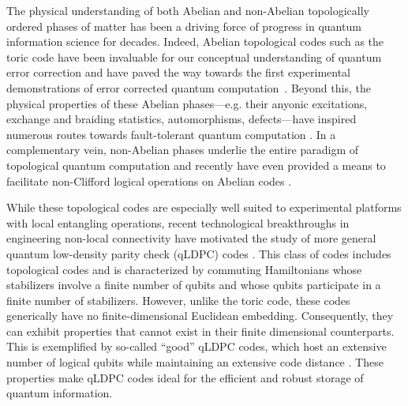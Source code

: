 \documentclass[aps,prx,reprint,superscriptaddress,nofootinbib]{revtex4-2}
\theoremstyle{definition}
\newcommand{\<}{\langle}
\renewcommand{\>}{\rangle}
\begin{document}
The physical understanding of both Abelian and non-Abelian topologically ordered phases of matter \cite{wen_topological_1990,RevModPhys.89.041004,Bravyi_2010} has been a driving force of progress in quantum information science for decades.
%
Indeed, Abelian topological codes such as the toric code have been invaluable for our conceptual understanding of quantum error correction and have paved the way towards the first experimental demonstrations of error corrected quantum computation~\cite{bluvstein_fault-tolerant_2026,bluvstein_logical_2024,google2025quantum}.
%
Beyond this, the physical properties of these Abelian phases—e.g. their anyonic excitations, exchange and braiding statistics, automorphisms, defects—have inspired numerous routes towards fault-tolerant quantum computation \cite{koenig_quantum_2010,yoshida_topological_2015,breuckmann_hyperbolic_2017,bridgeman_tensor_2017,kesselring_boundaries_2018,lavasani_universal_2019,zhu_instantaneous_2020,kesselring_anyon_2024,davydova_quantum_2024}.
%
In a complementary vein, non-Abelian phases underlie the entire paradigm of topological quantum computation \cite{Kitaev_2003,freedman_modular_2002,RevModPhys.80.1083,Bonderson_2008,levaillant_universal_2015,cui_universal_2015,beverland_protected_2016,cong_universal_2017,chen_universal_2025,lo_universal_2025} and recently have even provided a means to facilitate non-Clifford logical operations on Abelian codes \cite{bravyi_universal_2006,laubscher_universal_2019,margaritaknots,sajithcodes,kobayashi_clifford_2025,huang_hybrid_2025,warman_transversal_2025, hsin2025automorphismgaugetheorieshigher, hsin_non-abelian_2025}. 

While these topological codes are especially well suited to experimental platforms with local entangling operations, recent technological breakthroughs in engineering non-local connectivity \cite{Periwal_2021, bluvstein_logical_2024,chiu_continuous_2025,sinclair_fault-tolerant_2025,bluvstein_fault-tolerant_2026,moses_race-track_2023,ransford_helios_2025} have motivated the study of more general quantum low-density parity check (qLDPC) codes \cite{MacKay_2004,Tillich_2014,Breuckmann_2021_rev,panteleev_asymptotically_2022,Panteleev_2021,Breuckmann_2021,Hastings_2021,Leverrier_2015,leverrier2022quantumtannercodes,SipserSpiel,Bravyi_2024,Kovalev_2013}. 
%
This class of codes includes topological codes and is characterized by commuting Hamiltonians whose stabilizers involve a finite number of qubits and whose qubits participate in a finite number of stabilizers.
%
However, unlike the toric code, these codes generically have no finite-dimensional Euclidean embedding.
%
Consequently, they can exhibit properties that cannot exist in their finite dimensional counterparts. 
%
This is exemplified by so-called ``good'' qLDPC codes, which host an extensive number of logical qubits while maintaining an extensive code distance \cite{panteleev_asymptotically_2022,dinur_good_2023,leverrier2022quantumtannercodes,Breuckmann_2021}.
%
These properties make qLDPC codes ideal for the efficient and robust storage of quantum information.
\end{document}
